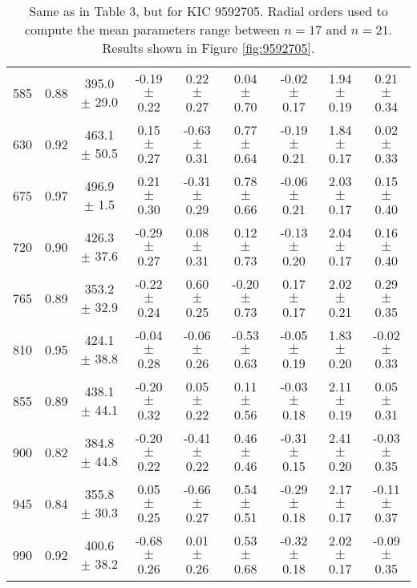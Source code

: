 \documentclass[twocolumn]{aastex61}%
\begin{document}
\begin{table*}[ht]
\begin{tabular}{ccc|ccccc|c}
585 & 0.88 & 395.0 $\pm$ 29.0 & -0.19 $\pm$ 0.22 & 0.22 $\pm$ 0.27 & 0.04 $\pm$ 0.70 & -0.02 $\pm$ 0.17 & 1.94 $\pm$ 0.19 & 0.21 $\pm$ 0.34\\
630 & 0.92 & 463.1 $\pm$ 50.5 & 0.15 $\pm$ 0.27 & -0.63 $\pm$ 0.31 & 0.77 $\pm$ 0.64 & -0.19 $\pm$ 0.21 & 1.84 $\pm$ 0.17 & 0.02 $\pm$ 0.33\\
675 & 0.97 & 496.9 $\pm$ 1.5 & 0.21 $\pm$ 0.30 & -0.31 $\pm$ 0.29 & 0.78 $\pm$ 0.66 & -0.06 $\pm$ 0.21 & 2.03 $\pm$ 0.17 & 0.15 $\pm$ 0.40\\
720 & 0.90 & 426.3 $\pm$ 37.6 & -0.29 $\pm$ 0.27 & 0.08 $\pm$ 0.31 & 0.12 $\pm$ 0.73 & -0.13 $\pm$ 0.20 & 2.04 $\pm$ 0.17 & 0.16 $\pm$ 0.40\\
765 & 0.89 & 353.2 $\pm$ 32.9 & -0.22 $\pm$ 0.24 & 0.60 $\pm$ 0.25 & -0.20 $\pm$ 0.73 & 0.17 $\pm$ 0.17 & 2.02 $\pm$ 0.21 & 0.29 $\pm$ 0.35\\
810 & 0.95 & 424.1 $\pm$ 38.8 & -0.04 $\pm$ 0.28 & -0.06 $\pm$ 0.26 & -0.53 $\pm$ 0.63 & -0.05 $\pm$ 0.19 & 1.83 $\pm$ 0.20 & -0.02 $\pm$ 0.33\\
855 & 0.89 & 438.1 $\pm$ 44.1 & -0.20 $\pm$ 0.32 & 0.05 $\pm$ 0.22 & 0.11 $\pm$ 0.56 & -0.03 $\pm$ 0.18 & 2.11 $\pm$ 0.19 & 0.05 $\pm$ 0.31\\
900 & 0.82 & 384.8 $\pm$ 44.8 & -0.20 $\pm$ 0.22 & -0.41 $\pm$ 0.22 & 0.46 $\pm$ 0.46 & -0.31 $\pm$ 0.15 & 2.41 $\pm$ 0.20 & -0.03 $\pm$ 0.35\\
945 & 0.84 & 355.8 $\pm$ 30.3 & 0.05 $\pm$ 0.25 & -0.66 $\pm$ 0.27 & 0.54 $\pm$ 0.51 & -0.29 $\pm$ 0.18 & 2.17 $\pm$ 0.17 & -0.11 $\pm$ 0.37\\
990 & 0.92 & 400.6 $\pm$ 38.2 & -0.68 $\pm$ 0.26 & 0.01 $\pm$ 0.26 & 0.53 $\pm$ 0.68 & -0.32 $\pm$ 0.18 & 2.02 $\pm$ 0.17 & -0.09 $\pm$ 0.35\\
\end{tabular}
\caption{Same as in Table 3, but for KIC 9592705. Radial orders used to compute the mean parameters range between $n=17$ and $n=21$. Results shown in Figure \ref{fig:9592705}.}\label{tab:9592705}
\end{table*}
\end{document}
